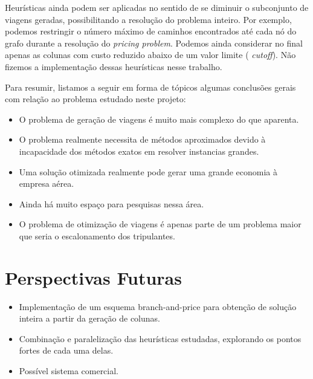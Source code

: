 Heurísticas ainda podem ser aplicadas no sentido de se diminuir o subconjunto de viagens geradas,
possibilitando a resolução do problema inteiro. Por exemplo, podemos restringir o número máximo de
caminhos encontrados até cada nó do grafo durante a resolução do {\it pricing problem}. Podemos
ainda considerar no final apenas as colunas com custo reduzido abaixo de um valor limite ({\it
cutoff}). Não fizemos a implementação dessas heurísticas nesse trabalho.

Para resumir, listamos a seguir em forma de tópicos algumas conclusões gerais com relação ao
problema estudado neste projeto:

\begin{itemize}
\item O problema de geração de viagens é muito mais complexo do que aparenta. 
\item O problema realmente necessita de métodos aproximados devido à incapacidade dos métodos exatos
em resolver instancias grandes.
\item Uma solução otimizada realmente pode gerar uma grande economia à empresa aérea.
\item Ainda há muito espaço para pesquisas nessa área. 
\item O problema de otimização de viagens é apenas parte de um problema maior que seria o
escalonamento dos tripulantes.
\end{itemize}


\section{Perspectivas Futuras}
\label{sec:perspectivas}

\begin{itemize} 
\item Implementação de um esquema branch-and-price para obtenção de solução inteira a partir da
geração de colunas.
\item Combinação e paralelização das heurísticas estudadas, explorando os pontos fortes de cada uma
delas.
\item Possível sistema comercial.
\end{itemize}

